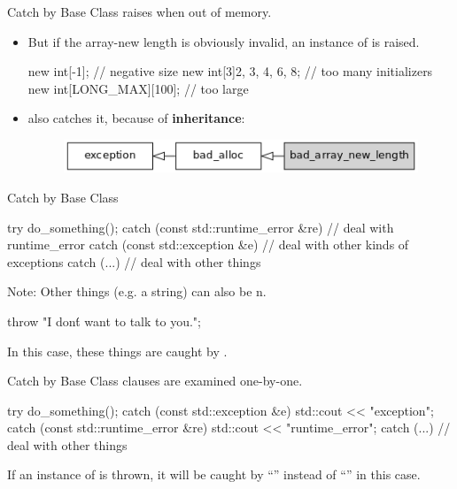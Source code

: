 \documentclass{beamer}
\begin{document}
\begin{frame}[fragile]{Catch by Base Class}
  \ttt{[]} raises  when out of memory.
  \begin{itemize}
    \item But if the array-new length is obviously invalid, an instance of  is raised.
    \begin{cpp}
new int[-1]; // negative size
new int[3]{2, 3, 4, 6, 8}; // too many initializers
new int[LONG_MAX][100]; // too large
    \end{cpp}
    \pause
    \item {}\ttt{(} also catches it, because of \textbf{inheritance}:
    \begin{figure}[h]
      \centering
      \includegraphics[scale=0.7]{img/bad_array_new_length-inheritance.png}
    \end{figure}
  \end{itemize}
\end{frame}

\begin{frame}[fragile]{Catch by Base Class}
  \begin{cpp}
try {
  do_something();
} catch (const std::runtime_error &re) {
  // deal with runtime_error
} catch (const std::exception &e) {
  // deal with other kinds of exceptions
} catch (...) {
  // deal with other things
}
  \end{cpp}
  \pause
  Note: Other things (e.g. a string) can also be n.
  \begin{cpp}
throw "I don\'t want to talk to you.";
  \end{cpp}
  In this case, these things are caught by .
\end{frame}

\begin{frame}[fragile]{Catch by Base Class}
   clauses are examined one-by-one.
  \begin{cpp}
try {
  do_something();
} catch (const std::exception &e) {
  std::cout << "exception\n";
} catch (const std::runtime_error &re) {
  std::cout << "runtime_error\n";
} catch (...) {
  // deal with other things
}
  \end{cpp}
  If an instance of  is thrown, it will be caught by ``'' instead of ``'' in this case.
\end{frame}
\end{document}
